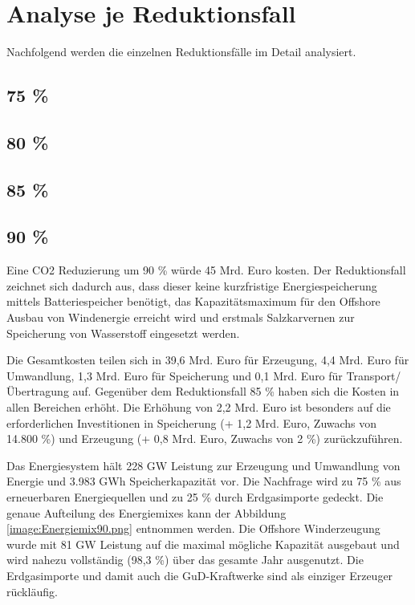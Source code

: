 \section{Analyse je Reduktionsfall}
Nachfolgend werden die einzelnen Reduktionsfälle im Detail analysiert.


\subsection{75 \%}

\subsection{80 \%}

\subsection{85 \%}

\subsection{90 \%}
Eine CO2 Reduzierung um 90 \% würde 45 Mrd. Euro kosten. Der Reduktionsfall zeichnet sich dadurch aus, dass dieser keine kurzfristige Energiespeicherung mittels Batteriespeicher benötigt, das Kapazitätsmaximum für den Offshore Ausbau von Windenergie erreicht wird und erstmals Salzkarvernen zur Speicherung von Wasserstoff eingesetzt werden.

Die Gesamtkosten teilen sich in 39,6 Mrd. Euro für Erzeugung, 4,4 Mrd. Euro für Umwandlung, 1,3 Mrd. Euro für Speicherung und 0,1 Mrd. Euro für Transport/Übertragung auf. Gegenüber dem Reduktionsfall 85 \% haben sich die Kosten in allen Bereichen erhöht. Die Erhöhung von 2,2 Mrd. Euro ist besonders auf die erforderlichen Investitionen in Speicherung (+ 1,2 Mrd. Euro, Zuwachs von 14.800 \%) und Erzeugung (+ 0,8 Mrd. Euro, Zuwachs von 2 \%) zurückzuführen.

Das Energiesystem hält 228 GW Leistung zur Erzeugung und Umwandlung von Energie und 3.983 GWh Speicherkapazität vor. Die Nachfrage wird zu 75 \% aus erneuerbaren Energiequellen und zu 25 \% durch Erdgasimporte gedeckt. Die genaue Aufteilung des Energiemixes kann der Abbildung \ref{image:Energiemix90.png} entnommen werden. Die Offshore Winderzeugung wurde mit 81 GW Leistung auf die maximal mögliche Kapazität ausgebaut und wird nahezu vollständig (98,3 \%) über das gesamte Jahr ausgenutzt. 
Die Erdgasimporte und damit auch die GuD-Kraftwerke sind als einziger Erzeuger rückläufig.  

